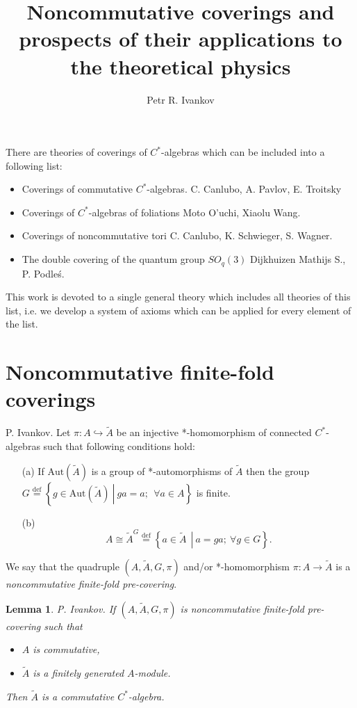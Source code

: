 \documentclass{beamer}
\title{Noncommutative coverings and prospects of their applications to the theoretical physics}
\author{Petr R. Ivankov \inst{1} }
\institute
{
	\inst{1}
	CSTS "Dinamika" , Moscow, Russia\\  \ \\
Geometry, Groups, Operator Algebras, and Integrability 2022\\
(June 27–July 2, 2022, Lomonosov Moscow State University, Moscow) \\ \ \\
	( arXiv:1904.13130
	)
}
\date{}
\theoremstyle{plain}
\newtheorem{lem}{Lemma}%
\newcommand{\be}{\begin{equation}}
\newcommand{\ee}{\end{equation}}
\newcommand{\Aut}{\mathrm{Aut}}
\newcommand{\bydef}{\stackrel{\mathrm{def}}{=}}
\newcommand{\hookto}{\hookrightarrow}        %
\begin{document}
\begin{frame}
  \titlepage
\end{frame}
\begin{frame}
There are theories of coverings of $C^*$-algebras which can be included into a following list:
\begin{itemize}
	\item Coverings of commutative $C^*$-algebras.  \alert{C. Canlubo, A. Pavlov, E. Troitsky}
	\item Coverings of $C^*$-algebras of foliations  \alert{Moto O'uchi,   Xiaolu Wang}.
	\item  Coverings of noncommutative tori \alert{C. Canlubo, K. Schwieger, S. Wagner}.
	\item {The double covering of the quantum group $SO_q(3)$} \alert{Dijkhuizen Mathijs S., P. Podle\'{s}}. 
\end{itemize}
This work is devoted to a single general theory which includes all theories of this list, i.e. we develop a  system of axioms which can be applied for every element of the list.
\end{frame}
	\section{Noncommutative finite-fold coverings}

\begin{frame}
	   \begin{definition}\label{pre_defn} \alert{P. Ivankov}.
		Let $\pi: A \hookto \widetilde{A}$ be an injective *-homomorphism of connected  $C^*$-algebras such that following conditions hold:
		\begin{enumerate}
			\item[(a)] If $\Aut\left(\widetilde{A} \right)$ is a group of *-automorphisms of $\widetilde{A}$ then the group  
			$
			G \bydef \left\{ \left.g \in \Aut\left(\widetilde{A} \right)~\right|~ ga = a;~~\forall a \in A\right\}
			$
			is finite.
			\item[(b)] 	\be\label{cond_b_eqn}
			A \cong \widetilde{A}^G\stackrel{\text{def}}{=}\left\{\left.a\in \widetilde{A}~~\right|~ a = g a;~ \forall g \in G\right\}.\ee
		\end{enumerate}
		We say that the quadruple $\left(A, \widetilde{A}, G, \pi \right)$ and/or *-homomorphism $\pi: A \to \widetilde{A}$   is a \textit{noncommutative finite-fold  pre-covering}. 
	\end{definition}
\begin{lem}  \alert{P. Ivankov}.
If $\left(A, \widetilde{A}, G, \pi \right)$ is noncommutative finite-fold  pre-covering such that
\begin{itemize}
	\item $A$ is commutative,
	\item $\widetilde{A}$ is a finitely generated $A$-module.
\end{itemize}
Then $\widetilde{A}$ is a commutative $C^*$-algebra.
\end{lem}
\end{frame}
\end{document}
